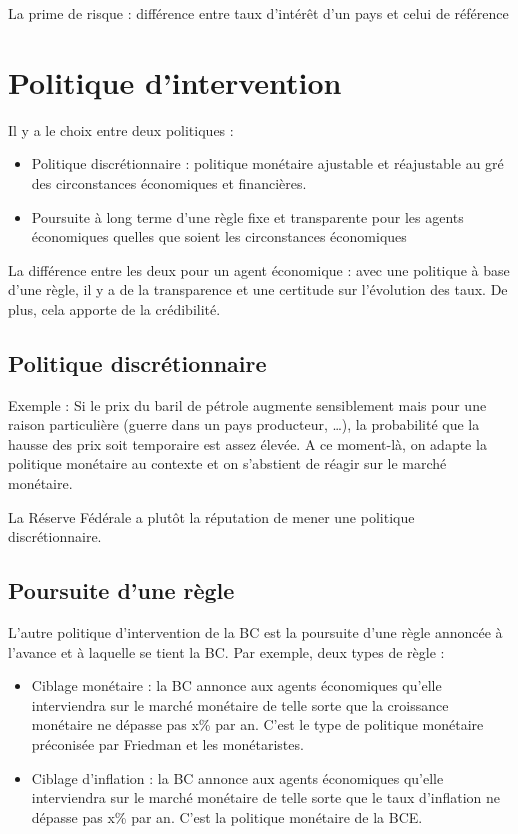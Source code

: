La prime de risque : différence entre taux d'intérêt d'un pays et celui de référence


\section{Politique d'intervention}

Il y a le choix entre deux politiques :

\begin{itemize}
	\item Politique discrétionnaire : politique monétaire ajustable et réajustable au gré des circonstances économiques et financières.
	\item Poursuite à long terme d'une règle fixe et transparente pour les agents économiques quelles que soient les circonstances économiques
\end{itemize}

La différence entre les deux pour un agent économique : avec une politique à base d'une règle, il y a de la transparence et une certitude sur l'évolution des taux. De plus, cela apporte de la crédibilité.

	\subsection{Politique discrétionnaire}

	Exemple : Si le prix du baril de pétrole augmente sensiblement mais pour une raison particulière (guerre dans un pays producteur, \dots), la probabilité que la hausse des prix soit temporaire est assez élevée. A ce moment-là, on adapte la politique monétaire au contexte et on s'abstient de réagir sur le marché monétaire.

	La Réserve Fédérale a plutôt la réputation de mener une politique discrétionnaire.

	\subsection{Poursuite d'une règle}
	
	L'autre politique d’intervention de la BC est la poursuite d'une règle annoncée 
à l'avance et à laquelle se tient la BC.
Par exemple, deux types de règle :
\begin{itemize}
	\item Ciblage monétaire : la BC annonce aux agents économiques qu'elle interviendra sur le marché monétaire de telle sorte que la croissance monétaire ne dépasse pas x\% par an. C'est le type de politique monétaire préconisée par Friedman et les monétaristes.
	\item  Ciblage d'inflation : la BC annonce aux agents économiques qu'elle interviendra sur le marché monétaire de telle sorte que le taux d’inflation ne dépasse pas x\% par an. C'est la politique monétaire de la BCE.
\end{itemize}



